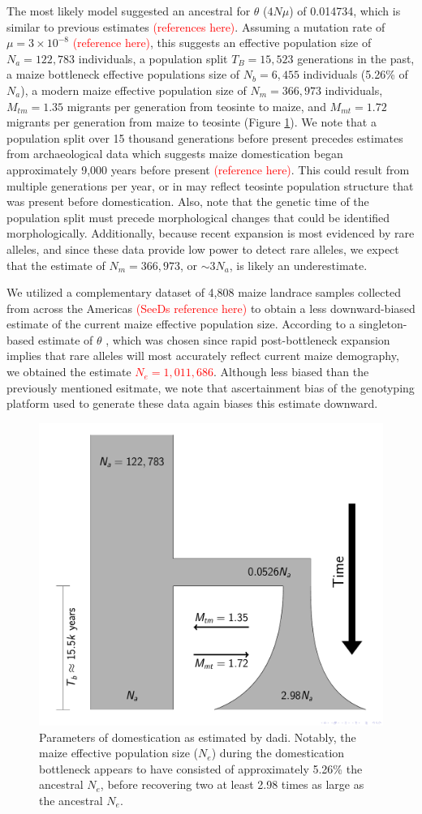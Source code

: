 \documentclass{pnastwo}
\begin{document}
\begin{article}
The most likely model suggested an ancestral for $\theta$ ($4N\mu$) of
0.014734, which is similar to previous estimates
\textcolor{red}{(references here)}. Assuming a mutation rate of $\mu =
3 \times 10^{-8}$ \textcolor{red}{(reference here)}, this suggests an effective
population size of $N_a = 122,783$ individuals, a population split
$T_B = 15,523$ generations in the past, a maize bottleneck
effective populations size of $N_b = 6,455$ individuals (5.26\% of
$N_a$), a modern maize effective population size of $N_m = 366,973$
individuals, $M_{tm} = 1.35$ migrants per generation from teosinte to
maize, and $M_{mt} = 1.72$ migrants per generation from maize to
teosinte (Figure \ref{bottleneck}). We note that a population
split over 15 thousand generations before present precedes estimates
from
archaeological data which suggests maize domestication began
approximately 9,000 years before present \textcolor{red}{(reference
  here)}. This could result from multiple generations per year, or in
may reflect teosinte population structure that was present before
domestication. Also, note that the genetic time of the population
split must precede morphological changes that could be identified
morphologically.   Additionally, because recent expansion is
most evidenced by rare alleles, and since these data provide low
power to detect rare alleles, we expect that the estimate of  $N_m =
366,973$, or $\sim 3N_a$, is likely an underestimate.

We utilized a complementary dataset of 4,808 maize landrace samples collected
from across the Americas \textcolor{red}{(SeeDs reference here)} to
obtain a less downward-biased estimate of the current maize effective
population size. According to a singleton-based estimate of $\theta$
\cite{fu1993}, which was chosen since rapid post-bottleneck expansion
implies that rare alleles will most accurately reflect current maize
demography, we obtained the estimate \textcolor{red}{$N_e =
  1,011,686$}. Although less biased than the previously mentioned
esitmate, we note that ascertainment bias of the
genotyping platform used to generate these data again biases this
estimate downward.


\begin{figure}[b]
\centering
\includegraphics[width=.4\textwidth]{FigsAndFiles/DomesticationModel/domesticationModel.pdf}
\caption{Parameters of domestication as estimated by dadi. Notably,
  the maize effective population size ($N_e$) during the domestication
  bottleneck appears to have consisted of approximately 5.26\%
  the ancestral $N_e$, before recovering two at least 2.98
  times as large as the ancestral $N_e$.}
\label{bottleneck}
\end{figure}



\end{article}
\end{document}

